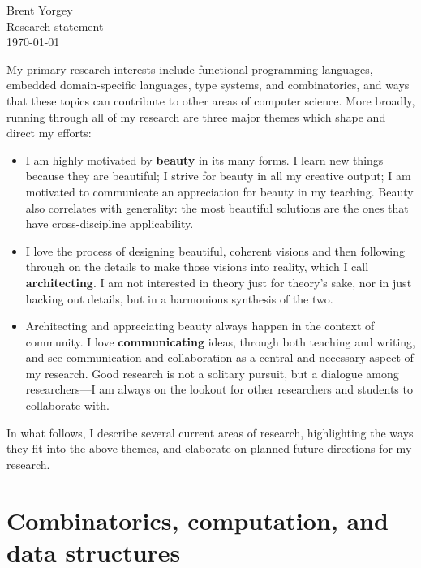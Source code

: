 \documentclass[12pt]{article}
\begin{document}
\noindent Brent Yorgey \\
Research statement \\
\today
\bigskip

My primary research interests include functional programming
languages, embedded domain-specific languages, type systems, and
combinatorics, and ways that these topics can contribute to other
areas of computer science.  More broadly, running through all of my
research are three major themes which shape and direct my efforts:

\begin{itemize}
\item I am highly motivated by \textbf{beauty} in its many forms.  I
  learn new things because they are beautiful; I strive for beauty in
  all my creative output; I am motivated to communicate an
  appreciation for beauty in my teaching.  Beauty also correlates
  with generality: the most beautiful solutions are the ones that have
  cross-discipline applicability.
\item I love the process of designing beautiful, coherent visions and
  then following through on the details to make those visions into
  reality, which I call \textbf{architecting}.  I am not interested in
  theory just for theory's sake, nor in just hacking out details, but
  in a harmonious synthesis of the two.
\item Architecting and appreciating beauty always happen in the
  context of community.  I love \textbf{communicating} ideas, through
  both teaching and writing, and see communication and collaboration
  as a central and necessary aspect of my research. Good research is
  not a solitary pursuit, but a dialogue among researchers---I am
  always on the lookout for other researchers and students to
  collaborate with.
\end{itemize}

In what follows, I describe several current areas of research,
highlighting the ways they fit into the above themes, and elaborate on
planned future directions for my research.


\section*{Combinatorics, computation, and data structures}
\label{sec:combinatorics}
\end{document}
